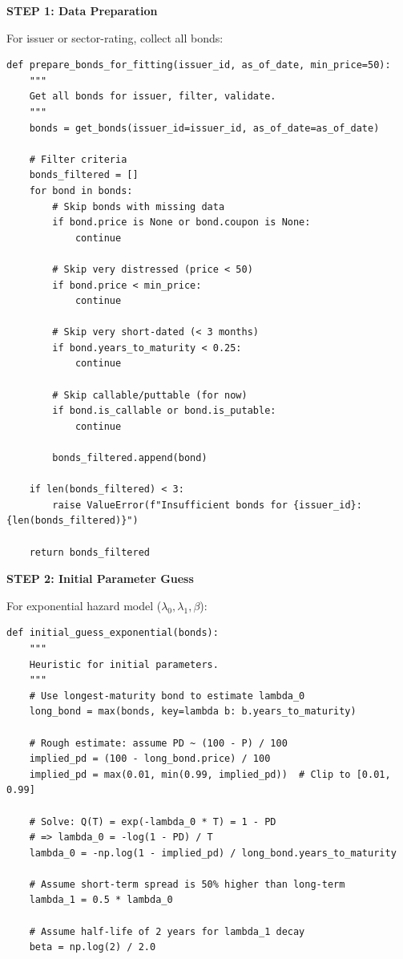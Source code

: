 \documentclass[11pt,a4paper]{article}
\begin{document}
\begin{implbox}
\textbf{STEP 1: Data Preparation}

For issuer or sector-rating, collect all bonds:
\begin{lstlisting}
def prepare_bonds_for_fitting(issuer_id, as_of_date, min_price=50):
    """
    Get all bonds for issuer, filter, validate.
    """
    bonds = get_bonds(issuer_id=issuer_id, as_of_date=as_of_date)
    
    # Filter criteria
    bonds_filtered = []
    for bond in bonds:
        # Skip bonds with missing data
        if bond.price is None or bond.coupon is None:
            continue
        
        # Skip very distressed (price < 50)
        if bond.price < min_price:
            continue
        
        # Skip very short-dated (< 3 months)
        if bond.years_to_maturity < 0.25:
            continue
        
        # Skip callable/puttable (for now)
        if bond.is_callable or bond.is_putable:
            continue
        
        bonds_filtered.append(bond)
    
    if len(bonds_filtered) < 3:
        raise ValueError(f"Insufficient bonds for {issuer_id}: {len(bonds_filtered)}")
    
    return bonds_filtered
\end{lstlisting}

\textbf{STEP 2: Initial Parameter Guess}

For exponential hazard model ($\lambda_0, \lambda_1, \beta$):
\begin{lstlisting}
def initial_guess_exponential(bonds):
    """
    Heuristic for initial parameters.
    """
    # Use longest-maturity bond to estimate lambda_0
    long_bond = max(bonds, key=lambda b: b.years_to_maturity)
    
    # Rough estimate: assume PD ~ (100 - P) / 100
    implied_pd = (100 - long_bond.price) / 100
    implied_pd = max(0.01, min(0.99, implied_pd))  # Clip to [0.01, 0.99]
    
    # Solve: Q(T) = exp(-lambda_0 * T) = 1 - PD
    # => lambda_0 = -log(1 - PD) / T
    lambda_0 = -np.log(1 - implied_pd) / long_bond.years_to_maturity
    
    # Assume short-term spread is 50% higher than long-term
    lambda_1 = 0.5 * lambda_0
    
    # Assume half-life of 2 years for lambda_1 decay
    beta = np.log(2) / 2.0
    

\end{lstlisting}
\end{implbox}
\end{document}
